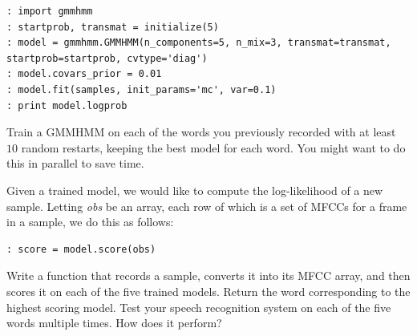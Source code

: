 \begin{lstlisting}[style=python]
: import gmmhmm
: startprob, transmat = initialize(5)
: model = gmmhmm.GMMHMM(n_components=5, n_mix=3, transmat=transmat, startprob=startprob, cvtype='diag')
: model.covars_prior = 0.01
: model.fit(samples, init_params='mc', var=0.1)
: print model.logprob
\end{lstlisting}

\begin{problem}
Train a GMMHMM on each of the words you previously recorded with at least $10$ random restarts, keeping the best model for each word. You might want to do this in parallel to save time.
\end{problem}

Given a trained model, we would like to compute the log-likelihood of a new sample. Letting \emph{obs} be an array, each row of which is a set of MFCCs for a frame in a sample, we do this as follows:

\begin{lstlisting}[style=python]
: score = model.score(obs)
\end{lstlisting}

\begin{problem}
Write a function that records a sample, converts it into its MFCC array, and then scores it on each of the five trained models. Return the word corresponding to the highest scoring model. Test your speech recognition system on each of the five words multiple times. How does it perform?
\end{problem}